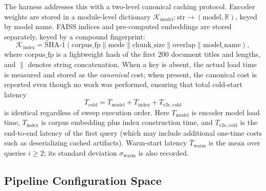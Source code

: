 \documentclass[11pt,a4paper]{article}
\begin{document}
The harness addresses this with a two-level canonical caching protocol.
Encoder weights are stored in a module-level dictionary
$\mathcal{K}_{\mathrm{model}}: \text{str} \to (\text{model}, \mathbb{R})$,
keyed by model name.
FAISS indices and pre-computed embeddings are stored separately, keyed by a
compound fingerprint:
\begin{equation}
  \mathcal{K}_{\mathrm{index}} =
    \mathrm{SHA\text{-}1}(\mathrm{corpus\_fp} \mathbin{\|}
    \mathrm{mode} \mathbin{\|} \mathrm{chunk\_size} \mathbin{\|}
    \mathrm{overlap} \mathbin{\|} \mathrm{model\_name}),
  \label{eq:key}
\end{equation}
where $\mathrm{corpus\_fp}$ is a lightweight hash of the first 200 document
titles and lengths, and $\|$ denotes string concatenation.
When a key is absent, the actual load time is measured and stored as the
\emph{canonical} cost; when present, the canonical cost is reported even though
no work was performed, ensuring that total cold-start latency
\begin{equation}
  T_{\mathrm{cold}} = T_{\mathrm{model}} + T_{\mathrm{index}} +
    T_{\mathrm{e2e,cold}}
  \label{eq:tcold}
\end{equation}
is identical regardless of sweep execution order.
Here $T_{\mathrm{model}}$ is encoder model load time,
$T_{\mathrm{index}}$ is corpus embedding plus index construction time, and
$T_{\mathrm{e2e,cold}}$ is the end-to-end latency of the first query
(which may include additional one-time costs such as deserializing cached
artifacts).
Warm-start latency $\bar{T}_{\mathrm{warm}}$ is the mean over queries
$i \geq 2$; its standard deviation $\sigma_{\mathrm{warm}}$ is also recorded.

\subsection{Pipeline Configuration Space}
\label{sec:configs}
\end{document}
